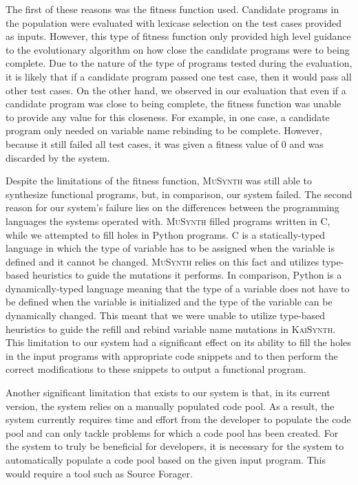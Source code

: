 \documentclass{article}
\begin{document}
The first of these reasons was the fitness function used. Candidate programs in the population were evaluated with lexicase selection on the test cases provided as inputs. However, this type of fitness function only provided high level guidance to the evolutionary algorithm on how close the candidate programs were to being complete. Due to the nature of the type of programs tested during the evaluation, it is likely that if a candidate program passed one test case, then it would pass all other test cases. On the other hand, we observed in our evaluation that even if a candidate program was close to being complete, the fitness function was unable to provide any value for this closeness. For example, in one case, a candidate program only needed on variable name rebinding to be complete. However, because it still failed all test cases, it was given a fitness value of 0 and was discarded by the system. 

Despite the limitations of the fitness function, \textsc{MuSynth} was still able to synthesize functional programs, but, in comparison, our system failed. The second reason for our system's failure lies on the differences between the programming languages the systems operated with. \textsc{MuSynth} filled programs written in C, while we attempted to fill holes in Python programs. C is a statically-typed language in which the type of variable has to be assigned when the variable is defined and it cannot be changed. \textsc{MuSynth} relies on this fact and utilizes type-based heuristics to guide the mutations it performs. In comparison, Python is a dynamically-typed language meaning that the type of a variable does not have to be defined when the variable is initialized and the type of the variable can be dynamically changed. This meant that we were unable to utilize type-based heuristics to guide the refill and rebind variable name mutations in \textsc{KaiSynth}. This limitation to our system had a significant effect on its ability to fill the holes in the input programs with appropriate code snippets and to then perform the correct modifications to these snippets to output a functional program.

Another significant limitation that exists to our system is that, in its current version, the system relies on a manually populated code pool. As a result, the system currently requires time and effort from the developer to populate the code pool and can only tackle problems for which a code pool has been created. For the system to truly be beneficial for developers, it is necessary for the system to automatically populate a code pool based on the given input program. This would require a tool such as Source Forager.
\end{document}
